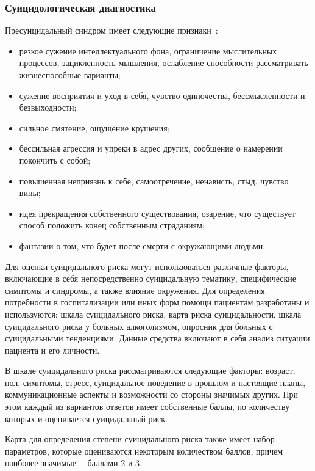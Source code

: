 \subsubsection{Суицидологическая диагностика}

Пресуицидальный синдром имеет следующие признаки~\cite{starsen}:
\begin{itemize}
	\item резкое сужение интеллектуального фона, ограничение мыслительных процессов, зацикленность мышления, ослабление способности рассматривать жизнеспособные варианты;
	\item сужение восприятия и уход в себя, чувство одиночества, бессмысленности и безвыходности;
	\item сильное смятение, ощущение крушения;
	\item бессильная агрессия и упреки в адрес других, сообщение о намерении покончить с собой;
	\item повышенная неприязнь к себе, самоотречение, ненависть, стыд, чувство вины;
	\item идея прекращения собственного существования, озарение, что существует способ положить конец собственным страданиям;
	\item фантазии о том, что будет после смерти с окружающими людьми.
\end{itemize}

Для оценки суицидального риска могут использоваться различные факторы, включающие в себя непосредственно суицидальную тематику, специфические симптомы и синдромы, а также влияние окружения. Для определения потребности в госпитализации или иных форм помощи пациентам разработаны и используются: шкала суицидального риска, карта риска суицидальности, шкала суицидального риска у больных алкоголизмом, опросник для больных с суицидальными тенденциями. Данные средства включают в себя анализ ситуации пациента и его личности.~\cite{starsen}

В шкале суицидального риска рассматриваются следующие факторы: возраст, пол, симптомы, стресс, суицидальное поведение в прошлом и настоящие планы, коммуникационные аспекты и возможности со стороны значимых других. При этом каждый из вариантов ответов имеет собственные баллы, по количеству которых и оценивается суицидальный риск.~\cite{starsen} 

Карта для определения степени суицидального риска также имеет набор параметров, которые оцениваются некоторым количеством баллов, причем наиболее значимые~-- баллами 2 и 3.~\cite{starsen}

